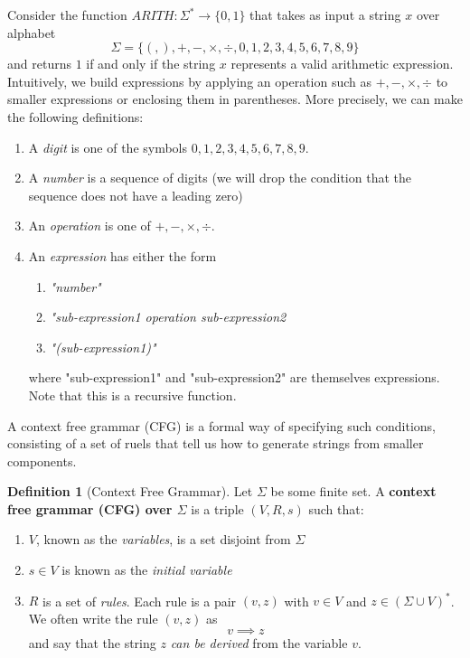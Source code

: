 \documentclass[a4paper, 12pt]{report}
\theoremstyle{remark}
\theoremstyle{definition}
\newtheorem{definition}{Definition}[section]
\begin{document}
Consider the function $ARITH: \Sigma^* \longrightarrow \{0,1\}$ that takes as input a string $x$ over alphabet 
\[\Sigma = \{(, ), +, -, \times, \div, 0, 1, 2, 3, 4, 5, 6, 7, 8, 9\}\]
and returns $1$ if and only if the string $x$ represents a valid arithmetic expression. Intuitively, we build expressions by applying an operation such as $+, -, \times, \div$ to smaller expressions or enclosing them in parentheses. More precisely, we can make the following definitions: 
\begin{enumerate}
    \item A \textit{digit} is one of the symbols $0, 1, 2, 3, 4, 5, 6, 7, 8, 9$. 
    \item A \textit{number} is a sequence of digits (we will drop the condition that the sequence does not have a leading zero)
    \item An \textit{operation} is one of $+, -, \times, \div$. 
    \item An \textit{expression} has either the form 
    \begin{enumerate}
        \item \textit{"number"}
        \item \textit{"sub-expression1 operation sub-expression2}
        \item \textit{"(sub-expression1)"}
    \end{enumerate}
    where "sub-expression1" and "sub-expression2" are themselves expressions. Note that this is a recursive function. 
\end{enumerate}
A context free grammar (CFG) is a formal way of specifying such conditions, consisting of a set of ruels that tell us how to generate strings from smaller components. 

\begin{definition}[Context Free Grammar]
Let $\Sigma$ be some finite set. A \textbf{context free grammar (CFG) over $\Sigma$} is a triple $(V, R, s)$ such that: 
\begin{enumerate}
    \item $V$, known as the \textit{variables}, is a set disjoint from $\Sigma$
    \item $s \in V$ is known as the \textit{initial variable}
    \item $R$ is a set of \textit{rules}. Each rule is a pair $(v, z)$ with $v \in V$ and $z \in (\Sigma \cup V)^*$. We often write the rule $(v, z)$ as 
    \[v \implies z\]
    and say that the string $z$ \textit{can be derived} from the variable $v$. 
\end{enumerate}
\end{definition}
\end{document}
